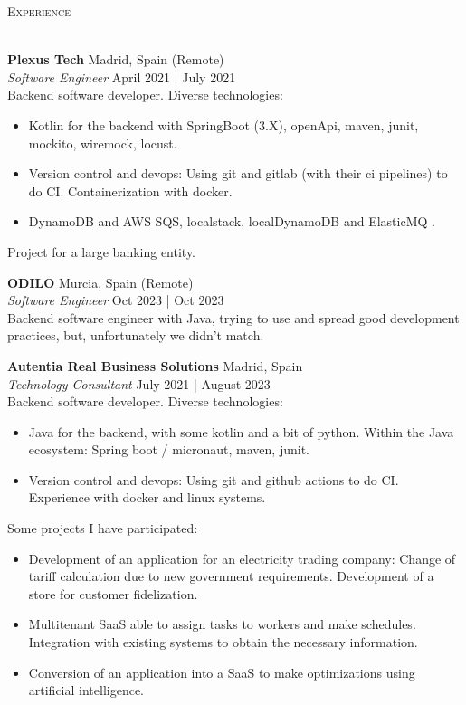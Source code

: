 \documentclass[a4paper]{article}
\newcommand{\lineunder} {
    \vspace*{-8pt} \\
    \hspace*{-18pt} \hrulefill \\
}
\newcommand{\header} [1] {
    {\hspace*{-18pt}\vspace*{6pt} \textsc{#1}}
    \vspace*{-6pt} \lineunder
}
\begin{document}
\header{Experience}
\vspace{1mm}

\textbf{Plexus Tech} \hfill Madrid, Spain (Remote)\\
\textit{Software Engineer} \hfill April 2021 | July 2021\\
\vspace{-1mm}
Backend software developer. Diverse technologies:

\begin{itemize} \itemsep 1pt
\item Kotlin for the backend with SpringBoot (3.X), openApi, maven, junit, mockito, wiremock, locust.
\item Version control and devops: Using git and gitlab (with their ci pipelines) to do CI. Containerization with docker.
\item DynamoDB and AWS SQS, localstack, localDynamoDB and ElasticMQ .
\end{itemize}

Project for a large banking entity.


\textbf{ODILO} \hfill Murcia, Spain (Remote)\\
\textit{Software Engineer} \hfill Oct 2023 | Oct 2023\\
\vspace{-1mm}
Backend software engineer with Java, trying to use and spread good development practices, but, unfortunately we didn't match.


\textbf{Autentia Real Business Solutions} \hfill Madrid, Spain\\
\textit{Technology Consultant} \hfill July 2021 | August 2023\\
\vspace{-1mm}
Backend software developer. Diverse technologies:

\begin{itemize} \itemsep 1pt
\item Java for the backend, with some kotlin and a bit of python. Within the Java ecosystem: Spring boot / micronaut, maven, junit.
\item Version control and devops: Using git and github actions to do CI. Experience with docker and linux systems.
\end{itemize}

Some projects I have participated:

\begin{itemize} \itemsep 1pt

\item Development of an application for an electricity trading company: Change of tariff calculation due to new government requirements. Development of a store for customer fidelization.
\item Multitenant SaaS able to assign tasks to workers and make schedules. Integration with existing systems to obtain the necessary information.
\item Conversion of an application into a SaaS to make optimizations using artificial intelligence.
\end{itemize}
\end{document}
